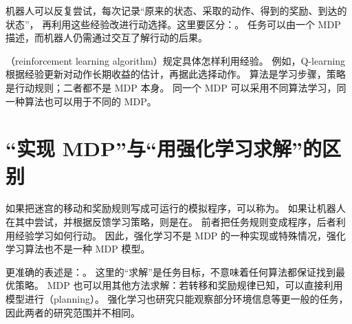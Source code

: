 \documentclass[UTF8]{ctexart}
\begin{document}
机器人可以反复尝试，每次记录“原来的状态、采取的动作、得到的奖励、到达的状态”，
再利用这些经验改进行动选择。这里要区分：。
任务可以由一个 MDP 描述，而机器人仍需通过交互了解行动的后果。

（reinforcement learning algorithm）规定具体怎样利用经验。
例如，Q-learning 根据经验更新对动作长期收益的估计，再据此选择动作。
算法是学习步骤，策略是行动规则；二者都不是 MDP 本身。
同一个 MDP 可以采用不同算法学习，同一种算法也可以用于不同的 MDP。

\section{“实现 MDP”与“用强化学习求解”的区别}
\label{sec:relation-implementation}

如果把迷宫的移动和奖励规则写成可运行的模拟程序，可以称为。
如果让机器人在其中尝试，并根据反馈学习策略，则是在。
前者把任务规则变成程序，后者利用经验学习如何行动。
因此，强化学习不是 MDP 的一种实现或特殊情况，强化学习算法也不是一种 MDP 模型。

更准确的表述是：。
这里的“求解”是任务目标，不意味着任何算法都保证找到最优策略。
MDP 也可以用其他方法求解：若转移和奖励规律已知，可以直接利用模型进行（planning）。
强化学习也研究只能观察部分环境信息等更一般的任务，因此两者的研究范围并不相同。
\end{document}
